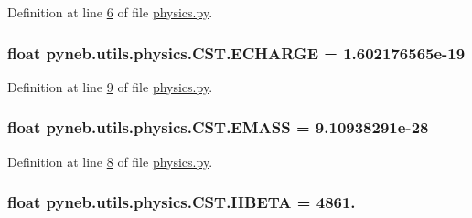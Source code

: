 Definition at line \hyperlink{physics_8py_source_l00006}{6} of file \hyperlink{physics_8py_source}{physics.\-py}.

\hypertarget{classpyneb_1_1utils_1_1physics_1_1_c_s_t_affe8f9c45db60b472fb1779b6e88c43b}{
\subsubsection[{E\-C\-H\-A\-R\-G\-E}]{\setlength{\rightskip}{0pt plus 5cm}float pyneb.\-utils.\-physics.\-C\-S\-T.\-E\-C\-H\-A\-R\-G\-E = 1.\-602176565e-\/19\hspace{0.3cm}{\ttfamily [static]}}}\label{classpyneb_1_1utils_1_1physics_1_1_c_s_t_affe8f9c45db60b472fb1779b6e88c43b}


Definition at line \hyperlink{physics_8py_source_l00009}{9} of file \hyperlink{physics_8py_source}{physics.\-py}.

\hypertarget{classpyneb_1_1utils_1_1physics_1_1_c_s_t_a0131d55ea22f1ecb699a8d5dcf18e62e}{
\subsubsection[{E\-M\-A\-S\-S}]{\setlength{\rightskip}{0pt plus 5cm}float pyneb.\-utils.\-physics.\-C\-S\-T.\-E\-M\-A\-S\-S = 9.\-10938291e-\/28\hspace{0.3cm}{\ttfamily [static]}}}\label{classpyneb_1_1utils_1_1physics_1_1_c_s_t_a0131d55ea22f1ecb699a8d5dcf18e62e}


Definition at line \hyperlink{physics_8py_source_l00008}{8} of file \hyperlink{physics_8py_source}{physics.\-py}.

\hypertarget{classpyneb_1_1utils_1_1physics_1_1_c_s_t_a969cf775617cba19633611eb7fc1b10b}{
\subsubsection[{H\-B\-E\-T\-A}]{\setlength{\rightskip}{0pt plus 5cm}float pyneb.\-utils.\-physics.\-C\-S\-T.\-H\-B\-E\-T\-A = 4861.\hspace{0.3cm}{\ttfamily [static]}}}\label{classpyneb_1_1utils_1_1physics_1_1_c_s_t_a969cf775617cba19633611eb7fc1b10b}



